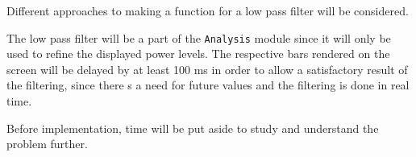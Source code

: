 Different approaches to making a function for a low pass filter will be considered.

The low pass filter will be a part of the \verb=Analysis= module since it will only be used to refine the displayed power levels. The respective bars rendered on the screen will be delayed by at least 100 ms in order to allow a satisfactory result of the filtering, since there s a need for future values and the filtering is done in real time.

Before implementation, time will be put aside to study and understand the problem further.
